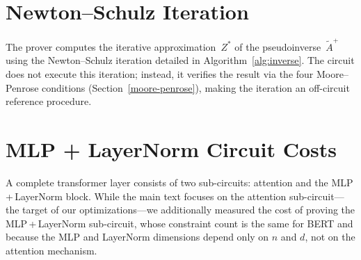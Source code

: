 \section{Newton--Schulz Iteration}
\label{appx:newton-schulz}

The prover computes the iterative approximation~$Z^{*}$ of the pseudoinverse~$\tilde{A}^{+}$ using the Newton--Schulz iteration detailed in Algorithm~\ref{alg:inverse}. The circuit does not execute this iteration; instead, it verifies the result via the four Moore--Penrose conditions (Section~\ref{moore-penrose}), making the iteration an off-circuit reference procedure.

\begin{algorithm}[H]
\raggedright
{}
\caption{Compute Moore--Penrose inverse}
\label{alg:inverse}
\end{algorithm}

\section{MLP + LayerNorm Circuit Costs}
\label{appx:mlp-costs}

A complete transformer layer consists of two sub-circuits: attention and the MLP\,+\,LayerNorm block. While the main text focuses on the attention sub-circuit---the target of our \name optimizations---we additionally measured the cost of proving the MLP\,+\,LayerNorm sub-circuit, whose constraint count is the same for BERT and \nystromformer because the MLP and LayerNorm dimensions depend only on $n$ and $d$, not on the attention mechanism.

